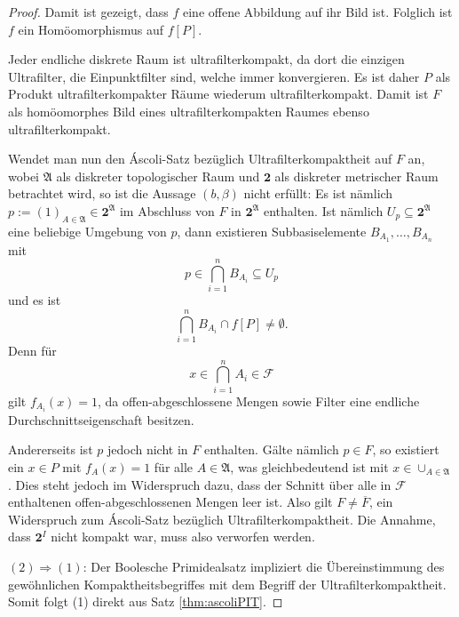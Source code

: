 \begin{proof}
  Damit ist gezeigt, dass $f$ eine offene Abbildung auf ihr Bild ist.
  Folglich ist $f$ ein Homöomorphismus auf $f[P]$.

  Jeder endliche diskrete Raum ist ultrafilterkompakt, da dort die einzigen Ultrafilter, die Einpunktfilter sind, welche immer konvergieren.
  Es ist daher $P$ als Produkt ultrafilterkompakter Räume wiederum ultrafilterkompakt.
  Damit ist $F$ als homöomorphes Bild eines ultrafilterkompakten Raumes ebenso ultrafilterkompakt.

  Wendet man nun den Áscoli-Satz bezüglich Ultrafilterkompaktheit auf $F$ an, wobei $\mathfrak{A}$ als diskreter topologischer Raum und $\mathbf{2}$ als diskreter metrischer Raum betrachtet wird, so ist die Aussage $(b, \beta)$ nicht erfüllt:
  Es ist nämlich $p := (1)_{A \in \mathfrak{A}} \in \mathbf{2}^\mathfrak{A}$ im Abschluss von $F$ in $\mathbf{2}^\mathfrak{A}$ enthalten.
  Ist nämlich $U_p \subseteq \mathbf{2}^\mathfrak{A}$ eine beliebige Umgebung von $p$, dann existieren Subbasiselemente $B_{A_1},\dots,B_{A_n}$ mit
  \begin{displaymath}
    p \in \bigcap_{i=1}^n B_{A_i} \subseteq U_p
  \end{displaymath}
  und es ist
  \begin{displaymath}
    \bigcap_{i=1}^n B_{A_i} \cap f[P] \neq \emptyset.
  \end{displaymath}
  Denn für 
  \begin{displaymath}
    x \in \bigcap_{i=1}^n A_i \in \mathcal{F}
  \end{displaymath}
  gilt $f_{A_i}(x) = 1$, da offen-abgeschlossene Mengen sowie Filter eine endliche Durchschnittseigenschaft besitzen.
  
  Andererseits ist $p$ jedoch nicht in $F$ enthalten. 
  Gälte nämlich $p \in F$, so existiert ein $x \in P$ mit $f_A(x) = 1$ für alle $A \in \mathfrak{A}$, was gleichbedeutend ist mit 
  $x \in \cup_{A \in \mathfrak{A}}$.
  Dies steht jedoch im Widerspruch dazu, dass der Schnitt über alle in $\mathcal{F}$ enthaltenen offen-abgeschlossenen Mengen leer ist.
  Also gilt $F \neq \overline{F}$, ein Widerspruch zum Áscoli-Satz bezüglich Ultrafilterkompaktheit.
  Die Annahme, dass $\mathbf{2}^I$ nicht kompakt war, muss also verworfen werden.

  $(2)\Rightarrow(1)$: Der Boolesche Primidealsatz impliziert die Übereinstimmung des gewöhnlichen Kompaktheitsbegriffes mit dem Begriff der Ultrafilterkompaktheit. Somit folgt (1) direkt aus Satz \ref{thm:ascoliPIT}.
\end{proof}


